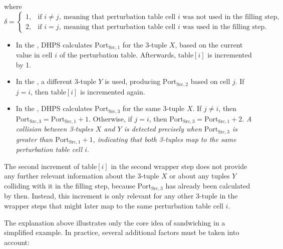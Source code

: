 \documentclass{report}
\begin{document}
where
\[
	\delta =
	\begin{cases}
		1, & \text{if } i \neq j,\ \text{meaning that perturbation table cell } i \text{ was not used in the filling step,} \\
		2, & \text{if } i = j,\ \text{meaning that perturbation table cell } i \text{ was used in the filling step.}
	\end{cases}
\]
\begin{itemize}
	\item In the , DHPS calculates \(\text{Port}_{\text{Src},1}\) for the 3-tuple \( X \), based on the current value in cell \( i \) of the perturbation table. Afterwards, \(\text{table}[i]\) is incremented by 1.
	\item In the , a different 3-tuple \( Y \) is used, producing \(\text{Port}_{\text{Src},2}\) based on cell \( j \). If \( j = i \), then \(\text{table}[i]\) is incremented again.
	\item In the , DHPS calculates \(\text{Port}_{\text{Src},3}\) for the same 3-tuple \( X \). If \( j \neq i \), then \(\text{Port}_{\text{Src},3} = \text{Port}_{\text{Src},1} + 1\). Otherwise, if \( j = i \), then \(\text{Port}_{\text{Src},3} = \text{Port}_{\text{Src},1} + 2\). \textit{A collision between 3-tuples \( X \) and \( Y \) is detected precisely when \(\text{Port}_{\text{Src},3}\) is greater than \(\text{Port}_{\text{Src},1} + 1\), indicating that both 3-tuples map to the same perturbation table cell \( i \)}.
\end{itemize}

	The second increment of \(\text{table}[i]\) in the second wrapper step does \alert{not provide any further relevant information} about the 3-tuple \( X \) or about any tuples \( Y \) colliding with it in the filling step, because \(\text{Port}_{\text{Src},3}\) has already been calculated by then. Instead, this increment is only relevant for any other 3-tuple in the wrapper steps that might later map to the same perturbation table cell \( i \).

The explanation above illustrates only the \alert{core idea of sandwiching} in a simplified example. In practice, several additional factors must be taken into account:
\end{document}
